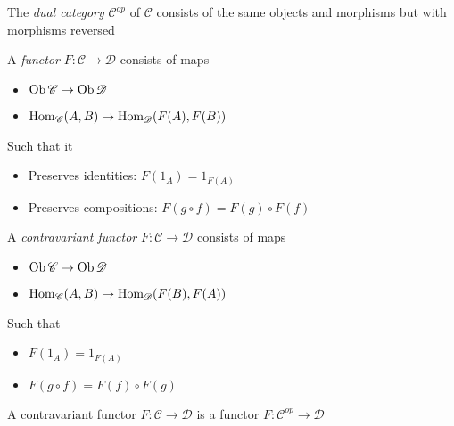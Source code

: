 \documentclass[main]{subfiles}
\begin{document}
\begin{definition}
The \textit{dual category} $\mathscr{C}^{op}$ of $\mathscr{C}$ consists of the same objects and morphisms but with morphisms reversed
\end{definition}

\begin{definition}
A \textit{functor} $F:\mathscr{C}\to\mathscr{D}$ consists of maps
\begin{itemize}
\item $\operatorname{Ob}\mathscr C\to\operatorname{Ob}\mathscr D$
\item $\operatorname{Hom}_{\mathscr{C}}(A,B)\to\operatorname{Hom}_{\mathscr{D}}(F(A),F(B))$
\end{itemize}
Such that it
\begin{itemize}
\item Preserves identities: $F(1_A)=1_{F(A)}$
\item Preserves compositions: $F(g\circ f)=F(g)\circ F(f)$
\end{itemize}
\end{definition}

\begin{definition}
A \textit{contravariant functor} $F:\mathscr C\to\mathscr D$ consists of maps
\begin{itemize}
\item $\operatorname{Ob}\mathscr{C}\to\operatorname{Ob}\mathscr{D}$
\item $\operatorname{Hom}_{\mathscr{C}}(A,B)\to\operatorname{Hom}_{\mathscr{D}}(F(B),F(A))$
\end{itemize}
Such that
\begin{itemize}
\item $F(1_A)=1_{F(A)}$
\item $F(g\circ f)=F(f)\circ F(g)$
\end{itemize}
\end{definition}

\begin{remark}
A contravariant functor $F:\mathscr C\to\mathscr D$ is a functor $F:\mathscr C^{op}\to\mathscr D$
\end{remark}
\end{document}
